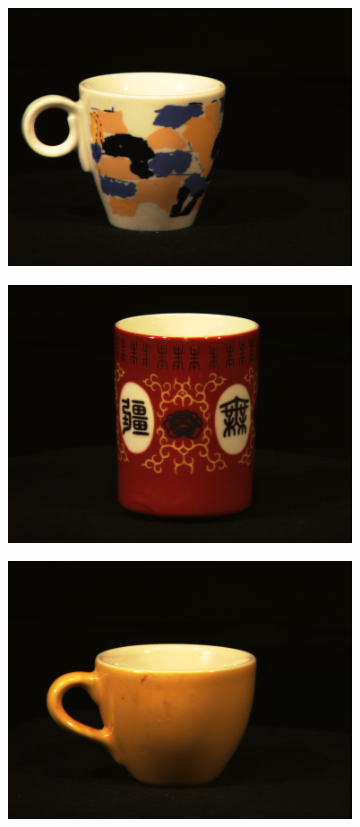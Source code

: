 \begin{figure}[tbp]
\begin{subfigure}{80pt}
    \includegraphics[width=\textwidth]{figures/aloi_original/262.png}
    \caption{}
	\end{subfigure}
	\begin{subfigure}{80pt}
        \centering
    \includegraphics[width=\textwidth]{figures/aloi_original/308.png}
    \caption{}
	\end{subfigure}
	\begin{subfigure}{80pt}
        \centering
    \includegraphics[width=\textwidth]{figures/aloi_original/507.png}

\end{subfigure}
\end{figure}
